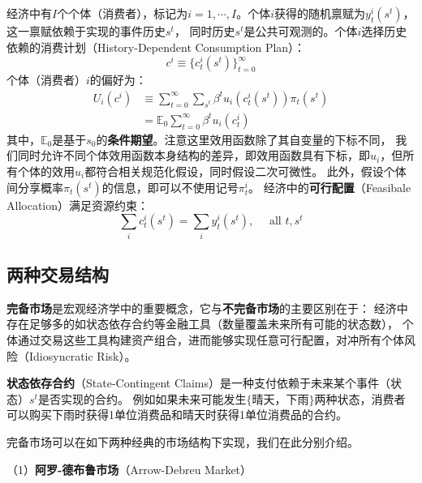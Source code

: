 经济中有$I$个个体（消费者），标记为$i=1,\cdots, I$。个体$i$获得的随机禀赋为$y_t^i\left(s^t\right)$，这一禀赋依赖于实现的事件历史$s^t$，
同时历史$s^t$是公共可观测的。个体$i$选择历史依赖的消费计划（History-Dependent Consumption Plan）：
$$
c^i \equiv \{c_t^i\left(s^t\right)\}_{t=0}^{\infty}
$$
个体（消费者）$i$的偏好为：
\begin{equation}    \label{eq-cm-preference-i}
    \begin{aligned}
        U_i\left(c^i\right) &\equiv \sum_{t=0}^{\infty} \sum_{s^t} \beta^t u_i\left(c_t^i\left(s^t\right)\right) \pi_t\left(s^t\right) \\
            &= \mathbb{E}_0 \sum_{t=0}^{\infty} \beta^t u_i\left(c_t^i\right)
    \end{aligned}
\end{equation}
其中，$\mathbb{E}_0$是基于$s_0$的\textbf{条件期望}。注意这里效用函数除了其自变量的下标不同，
我们同时允许不同个体效用函数本身结构的差异，即效用函数具有下标，即$u_i$，但所有个体的效用$u_i$都符合相关规范化假设，同时假设二次可微性。
此外，假设个体间分享概率$\pi_t\left(s^t\right)$的信息，即可以不使用记号$\pi_t^i$。
经济中的\textbf{可行配置}（Feasibale Allocation）满足资源约束：
\begin{equation}    \label{eq-cm-rc}
    \sum_i c_t^i\left(s^t\right) = \sum_i y_t^i\left(s^t\right), \quad \text { all } t, s^t
\end{equation}


\subsection{两种交易结构}

\textbf{完备市场}是宏观经济学中的重要概念，它与\textbf{不完备市场}的主要区别在于：
经济中存在足够多的如状态依存合约等金融工具（数量覆盖未来所有可能的状态数），
个体通过交易这些工具构建资产组合，进而能够实现任意可行配置，对冲所有个体风险（Idiosyncratic Risk）。
\begin{definition}
    \textbf{状态依存合约}（State-Contingent Claims）是一种支付依赖于未来某个事件（状态）$s^t$是否实现的合约。
    例如如果未来可能发生$\{\text{晴天，下雨}\}$两种状态，消费者可以购买下雨时获得1单位消费品和晴天时获得1单位消费品的合约。
\end{definition}

完备市场可以在如下两种经典的市场结构下实现，我们在此分别介绍。

（1）\textbf{阿罗-德布鲁市场}（Arrow-Debreu Market） 

